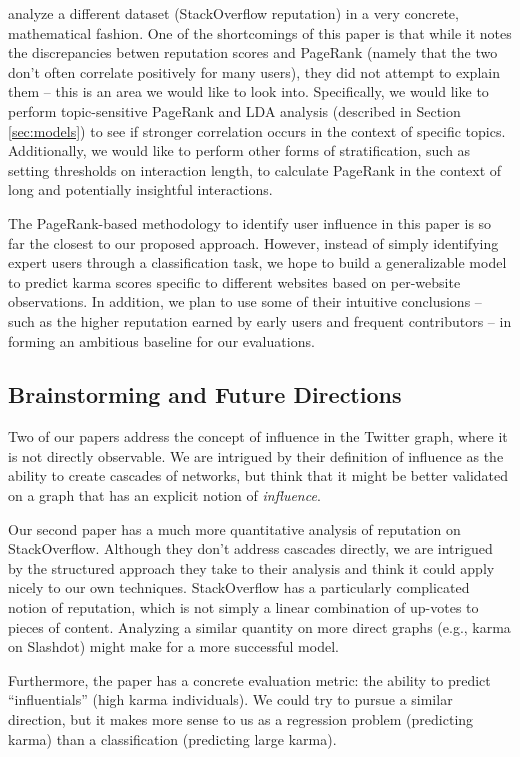 \documentclass[10pt]{article}
\begin{document}
\citet{movshovitzanalysis} analyze a different dataset (StackOverflow
reputation) in a very concrete, mathematical fashion.  One of the shortcomings
of this paper is that while it notes the discrepancies betwen reputation scores
and PageRank (namely that the two don't often correlate positively for many
users), they did not attempt to explain them -- this is an area we would like to
look into. Specifically, we would like to perform topic-sensitive PageRank and
LDA analysis (described in Section \ref{sec:models}) to see if stronger
correlation occurs in the context of specific topics.  Additionally, we would
like to perform other forms of stratification, such as setting thresholds on
interaction length, to calculate PageRank in the context of long and potentially
insightful interactions.

The PageRank-based methodology to identify user influence in this paper is so
far the closest to our proposed approach. However, instead of simply identifying
expert users through a classification task, we hope to build a generalizable
model to predict karma scores specific to different websites based on
per-website observations.  In addition, we plan to use some of their intuitive
conclusions -- such as the higher reputation earned by early users and frequent
contributors -- in forming an ambitious baseline for our evaluations.

\subsection{Brainstorming and Future Directions}

Two of our papers address the concept of influence in the Twitter graph, where
it is not directly observable. We are intrigued by their definition of influence
as the ability to create cascades of networks, but think that it might be better
validated on a graph that has an explicit notion of \textit{influence}.

Our second paper has a much more quantitative analysis of reputation on
StackOverflow.  Although they don't address cascades directly, we are intrigued
by the structured approach they take to their analysis and think it could apply
nicely to our own techniques.  StackOverflow has a particularly complicated
notion of reputation, which is not simply a linear combination of up-votes to
pieces of content. Analyzing a similar quantity on more direct graphs (e.g.,
karma on Slashdot) might make for a more successful model.

Furthermore, the paper has a concrete evaluation metric: the ability to predict
``influentials'' (high karma individuals). We could try to pursue a similar
direction, but it makes more sense to us as a regression problem (predicting
karma) than a classification (predicting large karma).
\end{document}
